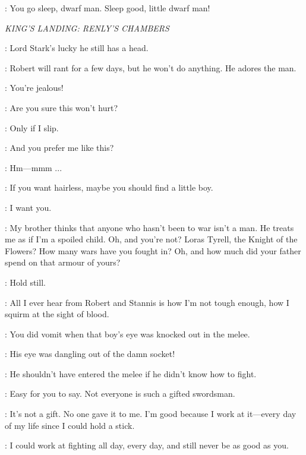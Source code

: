 \MORD: You go sleep, dwarf man. Sleep good, little dwarf man! 


\scene

\textit{KING'S LANDING: RENLY'S CHAMBERS} 


\LORAS: Lord Stark's lucky he still has a head. 

\RENLY: Robert will rant for a few days, but he won't do anything. He adores the man. 

\LORAS: You're jealous! 

\RENLY: Are you sure this won't hurt? 

\LORAS: Only if I slip. 

\RENLY: And you prefer me like this? 

\LORAS: Hm---mmm ...

\RENLY: If you want hairless, maybe you should find a little boy. 

\LORAS: I want you. 

\RENLY: My brother thinks that anyone who hasn't been to war isn't a man. He treats me as if I'm a spoiled child.  Oh, and you're not? Loras Tyrell, the Knight of the Flowers? How many wars have you fought in? Oh, and how much did your father spend on that armour of yours? 

\LORAS: Hold still. 

\RENLY: All I ever hear from Robert and Stannis is how I'm not tough enough, how I squirm at the sight of blood. 

\LORAS: You did vomit when that boy's eye was knocked out in the melee. 

\RENLY: His eye was dangling out of the damn socket! 

\LORAS: He shouldn't have entered the melee if he didn't know how to fight. 

\RENLY: Easy for you to say. Not everyone is such a gifted swordsman. 

\LORAS: It's not a gift. No one gave it to me. I'm good because I work at it---every day of my life since I could hold a stick. 

\RENLY: I could work at fighting all day, every day, and still never be as good as you. 

